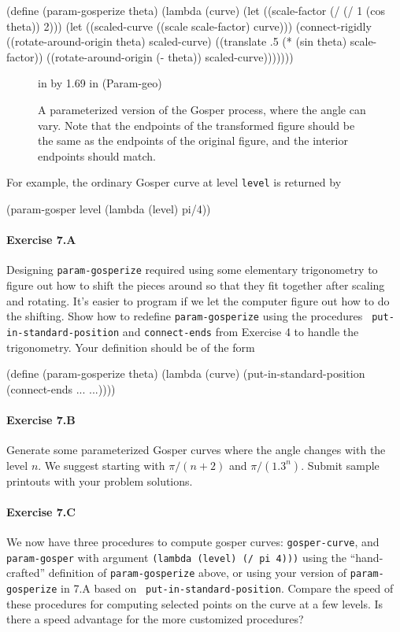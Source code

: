 \beginlisp
(define (param-gosperize theta)
  (lambda (curve)
    (let ((scale-factor (/ (/ 1 (cos theta)) 2)))
      (let ((scaled-curve ((scale scale-factor) curve)))
        (connect-rigidly ((rotate-around-origin theta) scaled-curve)
                         ((translate .5 (* (sin theta) scale-factor))
                          ((rotate-around-origin (- theta)) scaled-curve)))))))
\endlisp

\begin{figure}
 in by 1.69 in (Param-geo)
\caption{{\protect\footnotesize
A parameterized version of the Gosper process, where the
angle can vary.  Note that the endpoints of the transformed figure
should be the same as the endpoints of the original figure, and
the interior endpoints should match.}}
\label{param-geo}
\end{figure}


For example, the ordinary Gosper curve at level {\tt level} is returned by

\beginlisp
(param-gosper level (lambda (level) pi/4))
\endlisp

\paragraph{Exercise 7.A}  Designing {\tt param-gosperize} required
using some elementary trigonometry to figure out how to shift the pieces
around so that they fit together after scaling and rotating.  It's easier
to program if we let the computer figure out how to do the shifting.  Show
how to redefine {\tt param-gosperize} using the procedures {\tt
put-in-standard-position} and {\tt connect-ends} from Exercise 4 to handle
the trigonometry.  Your definition should be of the form

\beginlisp
(define (param-gosperize theta)
  (lambda (curve)
    (put-in-standard-position
      (connect-ends
        ...
        ...))))
\endlisp


\paragraph{Exercise 7.B}
Generate some parameterized Gosper curves where the angle changes with the
level $n$.  We suggest starting with $\pi/(n+2)$ and $\pi/(1.3^n)$.
Submit sample printouts with your problem solutions.

\paragraph{Exercise 7.C}
We now have three procedures to compute gosper curves: {\tt gosper-curve},
and {\tt param-gosper} with argument {\tt (lambda (level) (/ pi 4)))}
using the ``hand-crafted'' definition of {\tt param-gosperize} above, or
using your version of {\tt param-gosperize} in 7.A based on {\tt
put-in-standard-position}.  Compare the speed of these procedures for
computing selected points on the curve at a few levels.  Is there a speed
advantage for the more customized procedures?

